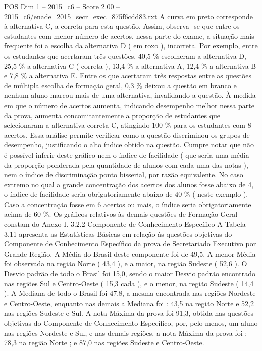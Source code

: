 \begin{textsample}{POS Dim 1 – 2015\_c6 – Score 2.00 – 2015\_c6/enade\_2015\_secr\_exec\_875f6cdd83.txt}
A curva em preto corresponde à alternativa C, a correta para esta questão.
Assim, observa -se que entre os estudantes com menor número de acertos, nessa parte do exame, a situação mais frequente foi a escolha da alternativa D ( em roxo ), incorreta.
Por exemplo, entre os estudantes que acertaram três questões, 40,5 \% escolheram a alternativa D, 25,5 \% a alternativa C ( correta ), 13,4 \% a alternativa A, 12,4 \% a alternativa B e 7,8 \% a alternativa E.
Entre os que acertaram três respostas entre as questões de múltipla escolha de formação geral, 0,3 \% deixou a questão em branco e nenhum aluno marcou mais de uma alternativa, invalidando a questão.
À medida em que o número de acertos aumenta, indicando desempenho melhor nessa parte da prova, aumenta concomitantemente a proporção de estudantes que selecionaram a alternativa correta C, atingindo 100 \% para os estudantes com 8 acertos.
Essa análise permite verificar como a questão discriminou os grupos de desempenho, justificando o alto índice obtido na questão.
Cumpre notar que não é possível inferir deste gráfico nem o índice de facilidade ( que seria uma média da proporção ponderada pela quantidade de alunos com cada uma das notas ), nem o índice de discriminação ponto bisserial, por razão equivalente.
No caso extremo no qual a grande concentração dos acertos dos alunos fosse abaixo de 4, o índice de facilidade seria obrigatoriamente abaixo de 40 \% ( neste exemplo ).
Caso a concentração fosse em 6 acertos ou mais, o índice seria obrigatoriamente acima de 60 \%.
Os gráficos relativos às demais questões de Formação Geral constam do Anexo I. 3.2.2 Componente de Conhecimento Específico A Tabela 3.11 apresenta as Estatísticas Básicas em relação às questões objetivas do Componente de Conhecimento Específico da prova de Secretariado Executivo por Grande Região.
A Média do Brasil deste componente foi de 49,5.
A menor Média foi observada na região Norte ( 43,4 ), e a maior, na região Sudeste ( 52,6 ).
O Desvio padrão de todo o Brasil foi 15,0, sendo o maior Desvio padrão encontrado nas regiões Sul e Centro-Oeste ( 15,3 cada ), e o menor, na região Sudeste ( 14,4 ).
A Mediana de todo o Brasil foi 47,8, a mesma encontrada nas regiões Nordeste e Centro-Oeste, enquanto nas demais a Mediana foi : 43,5 na região Norte e 52,2 nas regiões Sudeste e Sul.
A nota Máxima da prova foi 91,3, obtida nas questões objetivas do Componente de Conhecimento Específico, por, pelo menos, um aluno nas regiões Nordeste e Sul, e nas demais regiões, a nota Máxima da prova foi : 78,3 na região Norte ; e 87,0 nas regiões Sudeste e Centro-Oeste.

\end{textsample}
